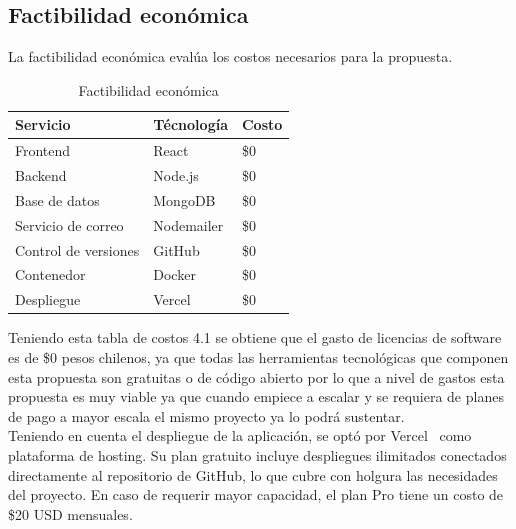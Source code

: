 ﻿\documentclass{iccmemoria}
\begin{document}
\subsection{Factibilidad económica}
La factibilidad económica evalúa los costos necesarios para la propuesta.\\
\begin{table}[H]
    \centering
    \caption{Factibilidad económica}
    \label{tab:factibilidad_económica} 
    
    \begin{tabular}{|p{5cm}|p{5cm}|p{2cm}|} 
        \hline %
        
        \textbf{Servicio} & \textbf{Técnología} & \textbf{Costo}\\
        \hline %
        
        Frontend & React & \$0\\
        \hline
        Backend & Node.js & \$0\\
        \hline
        Base de datos & MongoDB & \$0\\
        \hline 
        Servicio de correo & Nodemailer &\$0\\
        \hline
        Control de versiones & GitHub & \$0\\
        \hline
        Contenedor & Docker & \$0\\
        \hline
        Despliegue & Vercel & \$0\\
        \hline %
    \end{tabular}
\end{table}
Teniendo esta tabla de costos 4.1 se obtiene que el gasto de licencias de software es de \$0 pesos chilenos, ya que todas las herramientas tecnológicas que componen esta propuesta son gratuitas o de código abierto por lo que a nivel de gastos esta propuesta es muy viable ya que cuando empiece a escalar y se requiera de planes de pago a mayor escala el mismo proyecto ya lo podrá sustentar.  \\
Teniendo en cuenta el despliegue de la aplicación, se optó por Vercel~\cite{vercel} como plataforma de hosting. Su plan gratuito incluye despliegues ilimitados conectados directamente al repositorio de GitHub, lo que cubre con holgura las necesidades del proyecto. En caso de requerir mayor capacidad, el plan Pro tiene un costo de \$20 USD mensuales.\\
\end{document}

